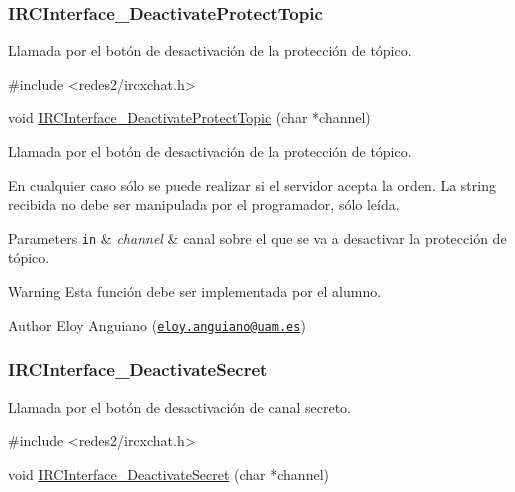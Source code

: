  \hypertarget{IRCInterface_DeactivateProtectTopic}{}\subsubsection{I\-R\-C\-Interface\-\_\-\-Deactivate\-Protect\-Topic}\label{IRCInterface_DeactivateProtectTopic}
Llamada por el botón de desactivación de la protección de tópico.


\begin{DoxyCode}
\textcolor{preprocessor}{#include <redes2/ircxchat.h>}

\textcolor{keywordtype}{void} \hyperlink{xchat2_8c_a5a57541a950f8c2c40b4b44c32b28ed9}{IRCInterface\_DeactivateProtectTopic} (\textcolor{keywordtype}{char} *channel)
\end{DoxyCode}


Llamada por el botón de desactivación de la protección de tópico.

En cualquier caso sólo se puede realizar si el servidor acepta la orden. La string recibida no debe ser manipulada por el programador, sólo leída.


\begin{DoxyParams}[1]{Parameters}
\mbox{\tt in}  & {\em channel} & canal sobre el que se va a desactivar la protección de tópico.\\
\hline
\end{DoxyParams}
\begin{DoxyWarning}{Warning}
Esta función debe ser implementada por el alumno.
\end{DoxyWarning}
\begin{DoxyAuthor}{Author}
Eloy Anguiano (\href{mailto:eloy.anguiano@uam.es}{\tt eloy.\-anguiano@uam.\-es})
\end{DoxyAuthor}


 \hypertarget{IRCInterface_DeactivateSecret}{}\subsubsection{I\-R\-C\-Interface\-\_\-\-Deactivate\-Secret}\label{IRCInterface_DeactivateSecret}
Llamada por el botón de desactivación de canal secreto.


\begin{DoxyCode}
\textcolor{preprocessor}{#include <redes2/ircxchat.h>}

\textcolor{keywordtype}{void} \hyperlink{xchat2_8c_a4956427664cabc7d5b2bd1589a207324}{IRCInterface\_DeactivateSecret} (\textcolor{keywordtype}{char} *channel)
\end{DoxyCode}


